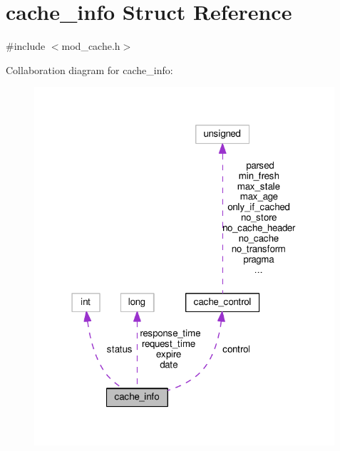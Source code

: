 \hypertarget{structcache__info}{}\section{cache\+\_\+info Struct Reference}
\label{structcache__info}


{\ttfamily \#include $<$mod\+\_\+cache.\+h$>$}



Collaboration diagram for cache\+\_\+info\+:
\nopagebreak
\begin{figure}[H]
\begin{center}
\leavevmode
\includegraphics[width=316pt]{structcache__info__coll__graph}
\end{center}
\end{figure}
